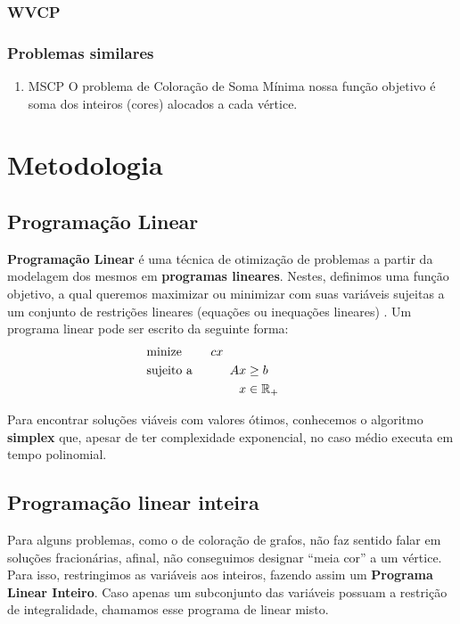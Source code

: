 \documentclass[11pt]{article}
\begin{document}
\subsubsection{WVCP}
\label{sec:org8779983}
\subsubsection{Problemas similares}
\label{sec:org3e3ccf0}
\begin{enumerate}
\item MSCP
\label{sec:org93d864c}
O problema de Coloração de Soma Mínima nossa função objetivo é soma dos inteiros (cores) alocados a cada vértice.
\end{enumerate}
\section{Metodologia}
\label{sec:org246b920}
\subsection{Programação Linear}
\label{sec:org37f3cb7}
\textbf{Programação Linear} é uma técnica de otimização de problemas a partir da modelagem dos mesmos em \textbf{programas lineares}.
Nestes, definimos uma função objetivo, a qual queremos maximizar ou minimizar com suas variáveis sujeitas a um conjunto de restrições lineares (equações ou inequações lineares) \textcite{Chvatal1983LinearProgramming} . Um programa linear pode ser escrito da seguinte forma:
\begin{alignat*}{4}
& \omit\rlap{minize \quad \quad $\displaystyle cx$} \\
& \mbox{sujeito a}&& \quad & Ax & \geq b  & \quad &  \\
&                 &&       & x               & \in \mathbb{R}_+ &      &
\end{alignat*}

Para encontrar soluções viáveis com valores ótimos, conhecemos o algoritmo \textbf{simplex} que, apesar de ter complexidade exponencial, no caso médio executa em tempo polinomial.

\subsection{Programação linear inteira}
\label{sec:org24c9174}
Para alguns problemas, como o de coloração de grafos, não faz sentido falar em soluções fracionárias, afinal, não conseguimos designar ``meia cor'' a um vértice.
Para isso, restringimos as variáveis aos inteiros, fazendo assim um \textbf{Programa Linear Inteiro}. Caso apenas um subconjunto das variáveis possuam a restrição de integralidade, chamamos esse programa de linear misto.
\end{document}
